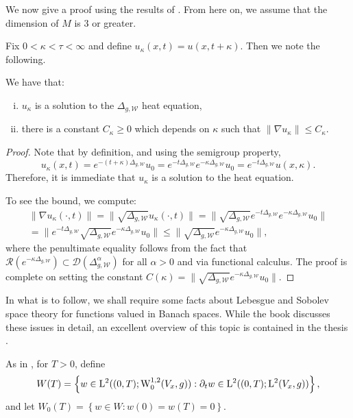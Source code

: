 \documentclass[a4paper, 12pt]{amsart}
\numberwithin{equation}{section}
\renewcommand{\~}{\tilde}
\renewcommand{\-}{\bar}
\newcommand{\8}{\infty}
\newcommand{\cW}{\mathcal{W}}
\newcommand{\dbrac}[1]{\left\{#1\right\}}
\newcommand{\set}[1]{\dbrac{#1}}
\newcommand{\dom}{ {\mathcal{D}}}
\newcommand{\ran}{ {\mathcal{R}}}
\newcommand{\norm}[1]{\| #1 \|}			%
\newcommand{\Lp}[2][{}]{{\rm L}^{#2}_{\rm #1}}		%
\newcommand{\Sob}[2][{}]{{\rm W}^{#2}_{\rm #1}}		%
\newcommand{\SobH}[2][{}]{{\Sob[#1]{#2,2}}}	%
\begin{document}
We now give a proof using the results of \cite{CS}.
From here on, we assume that the dimension of $M$ is $3$ or greater. 

Fix $0 < \kappa < \tau < \infty$ and 
define $u_\kappa(x,t) = u(x,t+\kappa)$. Then we note the following. 
\begin{lemma}
\label{lem:shiftsol}
We have that: 
\begin{enumerate}[(i)] 
\item $u_\kappa$ is a solution to the $\Delta_{g,\cW}$ heat equation, 
\item there is a constant $C_\kappa \geq 0$
	which depends on $\kappa$ 
	such that $\norm{\nabla u_\kappa} \leq C_\kappa$.
\end{enumerate} 
\end{lemma}
\begin{proof}
Note that by definition, and using the semigroup property, 
$$u_\kappa(x,t) = e^{-(t + \kappa)\Delta_{g,\cW}} u_0 
	=e^{-t \Delta_{g,\cW}}e^{-\kappa\Delta_{g,\cW}}u_0
	=e^{-t \Delta_{g,\cW}}u(x,\kappa).$$ 
Therefore, it is immediate that $u_\kappa$ is a solution
to the heat equation. 

To see the bound, we compute: 
\begin{multline*} 
\norm{ \nabla u_\kappa(\cdot, t)} 
	= \norm{ \sqrt{\Delta_{g,\cW}} u_\kappa(\cdot, t)} 
	= \norm{ \sqrt{\Delta_{g,\cW}} e^{-t\Delta_{g,\cW}} e^{-\kappa \Delta_{g,\cW}}u_0} \\
	= \norm{ e^{-t \Delta_{g,\cW}} \sqrt{ \Delta_{g,\cW}} e^{-\kappa \Delta_{g,\cW}}u_0}
	\leq \norm{\sqrt{ \Delta_{g,\cW}} e^{-\kappa \Delta_{g,\cW}}u_0},
\end{multline*}
where the penultimate equality follows from the fact that
$\ran(e^{-\kappa \Delta_{g,\cW}}) \subset \dom(\Delta_{g,\cW}^\alpha)$
for all $\alpha > 0$ and via functional calculus.
The proof is complete on setting the constant 
$C(\kappa) = \norm{\sqrt{ \Delta_{g,\cW}} e^{-\kappa \Delta_{g,\cW}}u_0}$.
\end{proof}

In what is to follow, we shall require some facts about 
Lebesgue and Sobolev space theory for functions valued 
in Banach spaces. While the book \cite{CH} discusses these issues
in detail, an excellent overview of this topic
is contained in the thesis \cite{Kreuter}.

As in \cite{CS}, for $T > 0$, define 
$$ W(T) = \set{ w \in \Lp{2}( (0,T); \SobH[0]{1}(V_x,g)): \partial_t w \in \Lp{2}((0,T); \Lp{2}(V_x, g))},$$
and let $W_0(T) = \set{ w \in W: w(0) = w(T) = 0}.$
\end{document}
